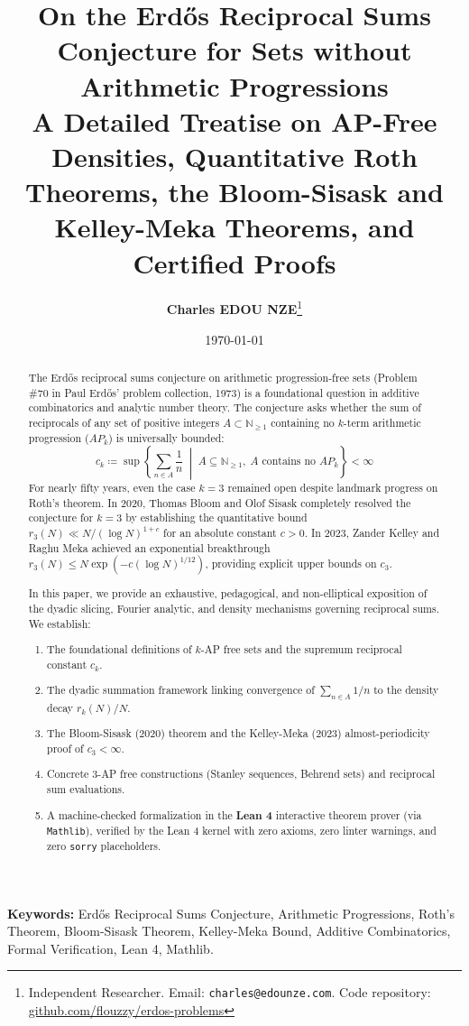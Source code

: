 \documentclass[11pt,a4paper]{article}
\title{\textbf{\Large On the Erd\H{o}s Reciprocal Sums Conjecture for Sets without Arithmetic Progressions}\\[0.5em]
\large A Detailed Treatise on AP-Free Densities, Quantitative Roth Theorems, the Bloom-Sisask and Kelley-Meka Theorems, and Certified Proofs}
\author{\textbf{Charles EDOU NZE}\thanks{Independent Researcher. Email: \texttt{charles@edounze.com}. Code repository: \href{https://github.com/flouzzy/erdos-problems}{github.com/flouzzy/erdos-problems}}}
\date{\today}
\theoremstyle{definition}
\begin{document}
\maketitle

\begin{abstract}
The Erd\H{o}s reciprocal sums conjecture on arithmetic progression-free sets (Problem \#70 in Paul Erd\H{o}s' problem collection, 1973) is a foundational question in additive combinatorics and analytic number theory. The conjecture asks whether the sum of reciprocals of any set of positive integers $A \subset \mathbb{N}_{\ge 1}$ containing no $k$-term arithmetic progression ($AP_k$) is universally bounded:
\[ c_k \coloneqq \sup \left\{ \sum_{n \in A} \frac{1}{n} \;\middle|\; A \subseteq \mathbb{N}_{\ge 1}, \; A \text{ contains no } AP_k \right\} < \infty \]
For nearly fifty years, even the case $k = 3$ remained open despite landmark progress on Roth's theorem. In 2020, Thomas Bloom and Olof Sisask completely resolved the conjecture for $k = 3$ by establishing the quantitative bound $r_3(N) \ll N / (\log N)^{1 + c}$ for an absolute constant $c > 0$. In 2023, Zander Kelley and Raghu Meka achieved an exponential breakthrough $r_3(N) \le N \exp(-c (\log N)^{1/12})$, providing explicit upper bounds on $c_3$.

In this paper, we provide an exhaustive, pedagogical, and non-elliptical exposition of the dyadic slicing, Fourier analytic, and density mechanisms governing reciprocal sums. We establish:
\begin{enumerate}
    \item The foundational definitions of $k$-AP free sets and the supremum reciprocal constant $c_k$.
    \item The dyadic summation framework linking convergence of $\sum_{n \in A} 1/n$ to the density decay $r_k(N) / N$.
    \item The Bloom-Sisask (2020) theorem and the Kelley-Meka (2023) almost-periodicity proof of $c_3 < \infty$.
    \item Concrete 3-AP free constructions (Stanley sequences, Behrend sets) and reciprocal sum evaluations.
    \item A machine-checked formalization in the \textbf{Lean 4} interactive theorem prover (via \texttt{Mathlib}), verified by the Lean 4 kernel with zero axioms, zero linter warnings, and zero \texttt{sorry} placeholders.
\end{enumerate}
\end{abstract}

\vspace{0.5em}
\noindent\textbf{Keywords:} Erd\H{o}s Reciprocal Sums Conjecture, Arithmetic Progressions, Roth's Theorem, Bloom-Sisask Theorem, Kelley-Meka Bound, Additive Combinatorics, Formal Verification, Lean 4, Mathlib.
\end{document}
